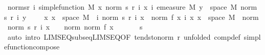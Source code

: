 \begin{isabellebody}
\ norm{\isacharunderscore}{\kern0pt}s{\isacharunderscore}{\kern0pt}r{\isacharcolon}{\kern0pt}\ {\isachardoublequoteopen}{\isasymAnd}i{\isachardot}{\kern0pt}\ simple{\isacharunderscore}{\kern0pt}function\ M\ {\isacharparenleft}{\kern0pt}{\isasymlambda}x{\isachardot}{\kern0pt}\ norm\ {\isacharparenleft}{\kern0pt}s\ {\isacharparenleft}{\kern0pt}r\ i{\isacharparenright}{\kern0pt}\ x{\isacharparenright}{\kern0pt}{\isacharparenright}{\kern0pt}{\isachardoublequoteclose}\ {\isachardoublequoteopen}{\isasymAnd}i{\isachardot}{\kern0pt}\ emeasure\ M\ {\isacharbraceleft}{\kern0pt}y\ {\isasymin}\ space\ M{\isachardot}{\kern0pt}\ norm\ {\isacharparenleft}{\kern0pt}s\ {\isacharparenleft}{\kern0pt}r\ i{\isacharparenright}{\kern0pt}\ y{\isacharparenright}{\kern0pt}\ {\isasymnoteq}\ {}{\isacharbraceright}{\kern0pt}\ {\isasymnoteq}\ {\isasyminfinity}{\isachardoublequoteclose}\ {\isachardoublequoteopen}{\isasymAnd}x{\isachardot}{\kern0pt}\ x\ {\isasymin}\ space\ M\ {\isasymLongrightarrow}\ {\isacharparenleft}{\kern0pt}{\isasymlambda}i{\isachardot}{\kern0pt}\ norm\ {\isacharparenleft}{\kern0pt}s\ {\isacharparenleft}{\kern0pt}r\ i{\isacharparenright}{\kern0pt}\ x{\isacharparenright}{\kern0pt}{\isacharparenright}{\kern0pt}\ {\isasymlonglonglongrightarrow}\ norm\ {\isacharparenleft}{\kern0pt}f\ x{\isacharparenright}{\kern0pt}{\isachardoublequoteclose}\ {\isachardoublequoteopen}{\isasymAnd}i\ x{\isachardot}{\kern0pt}\ x\ {\isasymin}\ space\ M\ {\isasymLongrightarrow}\ norm\ {\isacharparenleft}{\kern0pt}norm\ {\isacharparenleft}{\kern0pt}s\ {\isacharparenleft}{\kern0pt}r\ i{\isacharparenright}{\kern0pt}\ x{\isacharparenright}{\kern0pt}{\isacharparenright}{\kern0pt}\ {\isasymle}\ {}\ {\isacharasterisk}{\kern0pt}\ norm\ {\isacharparenleft}{\kern0pt}norm\ {\isacharparenleft}{\kern0pt}f\ x{\isacharparenright}{\kern0pt}{\isacharparenright}{\kern0pt}{\isachardoublequoteclose}\ \isanewline
\ \ \ \ \isamarkupfalse%
\ s\ \isamarkupfalse%
\ {\isacharparenleft}{\kern0pt}auto\ intro{\isacharcolon}{\kern0pt}\ LIMSEQ{\isacharunderscore}{\kern0pt}subseq{\isacharunderscore}{\kern0pt}LIMSEQ{\isacharbrackleft}{\kern0pt}OF\ tendsto{\isacharunderscore}{\kern0pt}norm\ r{\isacharparenleft}{\kern0pt}{}{\isacharparenright}{\kern0pt}{\isacharcomma}{\kern0pt}\ unfolded\ comp{\isacharunderscore}{\kern0pt}def{\isacharbrackright}{\kern0pt}\ simple{\isacharunderscore}{\kern0pt}function{\isacharunderscore}{\kern0pt}compose{}{\isacharparenright}{\kern0pt}\ \isanewline
\ \ \isanewline
\ \ \isamarkupfalse%

\end{isabellebody}
